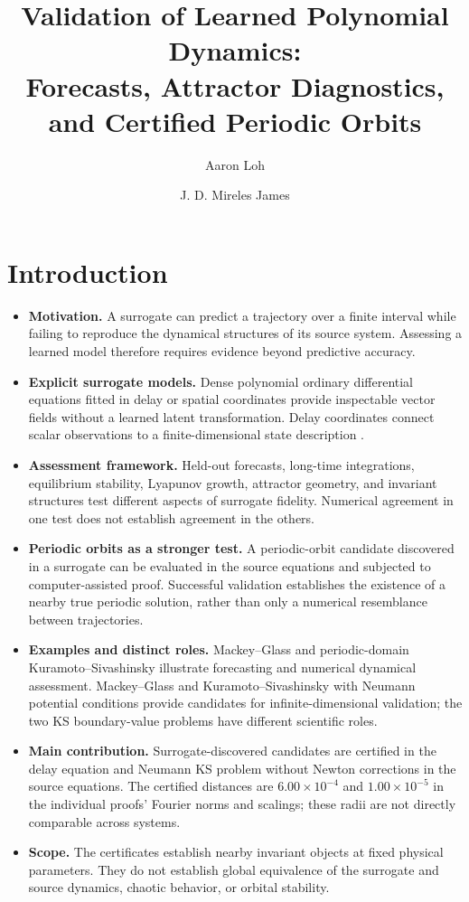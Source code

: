 \documentclass[11pt]{article}
\title{Validation of Learned Polynomial Dynamics:\protect\\Forecasts, Attractor Diagnostics, and Certified Periodic Orbits}
\author{Aaron Loh \and J. D. Mireles James}
\date{}
\begin{document}
\maketitle

\section{Introduction}
\label{sec:introduction}
\begin{itemize}
 \item \textbf{Motivation.} A surrogate can predict a trajectory over a finite
 interval while failing to reproduce the dynamical structures of its source
 system. Assessing a learned model therefore requires evidence beyond
 predictive accuracy.
 \item \textbf{Explicit surrogate models.} Dense polynomial ordinary
 differential equations fitted in delay or spatial coordinates provide
 inspectable vector fields without a learned latent transformation. Delay
 coordinates connect scalar observations to a finite-dimensional state
 description \cite{takens1981,sauer1991}.
 \item \textbf{Assessment framework.} Held-out forecasts, long-time
 integrations, equilibrium stability, Lyapunov growth, attractor geometry,
 and invariant structures test different aspects of surrogate fidelity.
 Numerical agreement in one test does not establish agreement in the others.
 \item \textbf{Periodic orbits as a stronger test.} A periodic-orbit candidate
 discovered in a surrogate can be evaluated in the source equations and
 subjected to computer-assisted proof. Successful validation establishes
 the existence of a nearby true periodic solution, rather than only a
 numerical resemblance between trajectories.
 \item \textbf{Examples and distinct roles.} Mackey--Glass and periodic-domain
 Kuramoto--Sivashinsky illustrate forecasting and numerical dynamical
 assessment. Mackey--Glass and Kuramoto--Sivashinsky with Neumann potential
 conditions provide candidates for infinite-dimensional validation; the two
 KS boundary-value problems have different scientific roles.
 \item \textbf{Main contribution.} Surrogate-discovered candidates are
 certified in the delay equation and Neumann KS problem without Newton
 corrections in the source equations. The certified distances are
 $6.00\times10^{-4}$ and $1.00\times10^{-5}$ in the individual proofs' Fourier
 norms and scalings; these radii are not directly comparable across systems.
 \item \textbf{Scope.} The certificates establish nearby invariant objects
 at fixed physical parameters. They do not establish global equivalence of
 the surrogate and source dynamics, chaotic behavior, or orbital stability.
\end{itemize}
\end{document}
